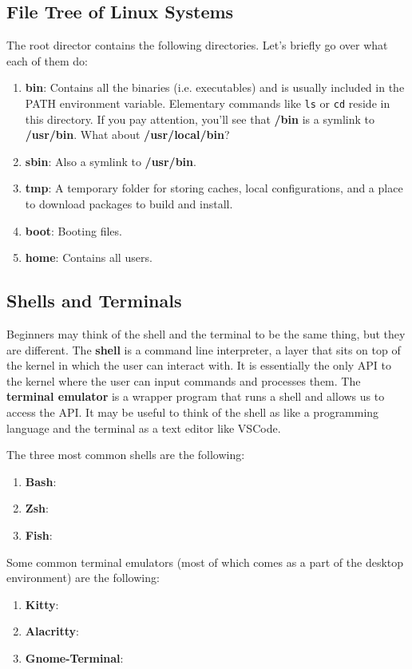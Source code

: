 \documentclass{article}
\begin{document}
  \subsection{File Tree of Linux Systems}

    The root director contains the following directories. Let's briefly go over what each of them do: 
    \begin{enumerate}
      \item \textbf{bin}: Contains all the binaries (i.e. executables) and is usually included in the PATH environment variable. Elementary commands like \texttt{ls} or \texttt{cd} reside in this directory. If you pay attention, you'll see that \textbf{/bin} is a symlink to \textbf{/usr/bin}. What about \textbf{/usr/local/bin}? 
      \item \textbf{sbin}: Also a symlink to \textbf{/usr/bin}.   
      \item \textbf{tmp}: A temporary folder for storing caches, local configurations, and a place to download packages to build and install. 
      \item \textbf{boot}: Booting files. 
      \item \textbf{home}: Contains all users. 
    \end{enumerate}
  
  \subsection{Shells and Terminals}

    Beginners may think of the shell and the terminal to be the same thing, but they are different. The \textbf{shell} is a command line interpreter, a layer that sits on top of the kernel in which the user can interact with. It is essentially the only API to the kernel where the user can input commands and processes them. The \textbf{terminal emulator} is a wrapper program that runs a shell and allows us to access the API. It may be useful to think of the shell as like a programming language and the terminal as a text editor like VSCode. 

    The three most common shells are the following: 
    \begin{enumerate}
      \item \textbf{Bash}: 
      \item \textbf{Zsh}: 
      \item \textbf{Fish}:  
    \end{enumerate}

    Some common terminal emulators (most of which comes as a part of the desktop environment) are the following: 
    \begin{enumerate}
      \item \textbf{Kitty}: 
      \item \textbf{Alacritty}: 
      \item \textbf{Gnome-Terminal}: 
    \end{enumerate}
\end{document}

